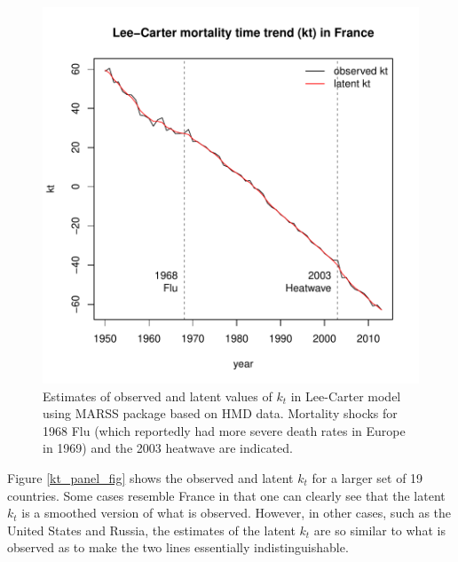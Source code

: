 \documentclass[12pt]{article}
\begin{document}
\begin{figure}
  \includegraphics[width=1.05\textwidth]{../code/france_example.pdf}
  \caption{Estimates of observed and latent values of $k_t$ in
    Lee-Carter model using MARSS package based on HMD data. Mortality
    shocks for 1968 Flu (which reportedly had more severe death rates
    in Europe in 1969) and the 2003 heatwave are indicated.}
    \label{france_fig}
\end{figure}


Figure \ref{kt_panel_fig} shows the observed and latent $k_t$ for a larger set of
19 countries. Some cases resemble France in that one can clearly see that
the latent $k_t$ is a smoothed version of what is observed. However,
in other cases, such as the United States and Russia, the estimates of
the latent $k_t$ are so similar to what is observed as to make the two
lines essentially indistinguishable.
\end{document}
